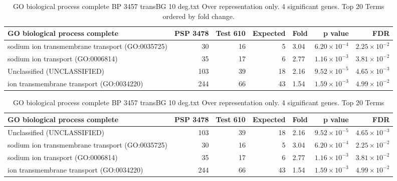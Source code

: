 \begin{table}[ht]
\centering
\begin{adjustbox}{width=\textwidth}
\begin{tabular}{lrrrlrr}
  \hline
GO biological process complete & PSP 3478 & Test 610 & Expected & Fold & p value & FDR \\ 
  \hline
sodium ion transmembrane transport (GO:0035725) & 30 & 16 & 5 & 3.04 & $6.20 \times 10^{-4}$ & $2.25 \times 10^{-2}$ \\ 
  sodium ion transport (GO:0006814) & 35 & 17 & 6 & 2.77 & $1.16 \times 10^{-3}$ & $3.81 \times 10^{-2}$ \\ 
  Unclassified (UNCLASSIFIED) & 103 & 39 & 18 & 2.16 & $9.52 \times 10^{-5}$ & $4.65 \times 10^{-3}$ \\ 
  ion transmembrane transport (GO:0034220) & 244 & 66 & 43 & 1.54 & $1.59 \times 10^{-3}$ & $4.99 \times 10^{-2}$ \\ 
   \hline
\end{tabular}
\end{adjustbox}
\caption{GO biological process complete BP 3457 transBG 10 deg.txt Over representation only. 4 significant genes. Top 20 Terms ordered by fold change. } 
\label{tab:GO biological process complete BP 3457 transBG 10 deg.txt Over representation only. 4 significant genes. Top 20 Terms ordered by fold change. }
\end{table}


\begin{table}[ht] 
\centering
\begin{adjustbox}{width=\textwidth}
\begin{tabular}{lrrrlrr}
  \hline
GO biological process complete & PSP 3478 & Test 610 & Expected & Fold & p value & FDR \\ 
  \hline
Unclassified (UNCLASSIFIED) & 103 & 39 & 18 & 2.16 & $9.52 \times 10^{-5}$ & $4.65 \times 10^{-3}$ \\ 
  sodium ion transmembrane transport (GO:0035725) & 30 & 16 & 5 & 3.04 & $6.20 \times 10^{-4}$ & $2.25 \times 10^{-2}$ \\ 
  sodium ion transport (GO:0006814) & 35 & 17 & 6 & 2.77 & $1.16 \times 10^{-3}$ & $3.81 \times 10^{-2}$ \\ 
  ion transmembrane transport (GO:0034220) & 244 & 66 & 43 & 1.54 & $1.59 \times 10^{-3}$ & $4.99 \times 10^{-2}$ \\ 
   \hline
\end{tabular}
\end{adjustbox}
\caption{GO biological process complete BP 3457 transBG 10 deg.txt Over representation only. 4 significant genes. Top 20 Terms} 
\label{tab:GO biological process complete BP 3457 transBG 10 deg.txt Over representation only. 4 significant genes. Top 20 Terms}
\end{table}


